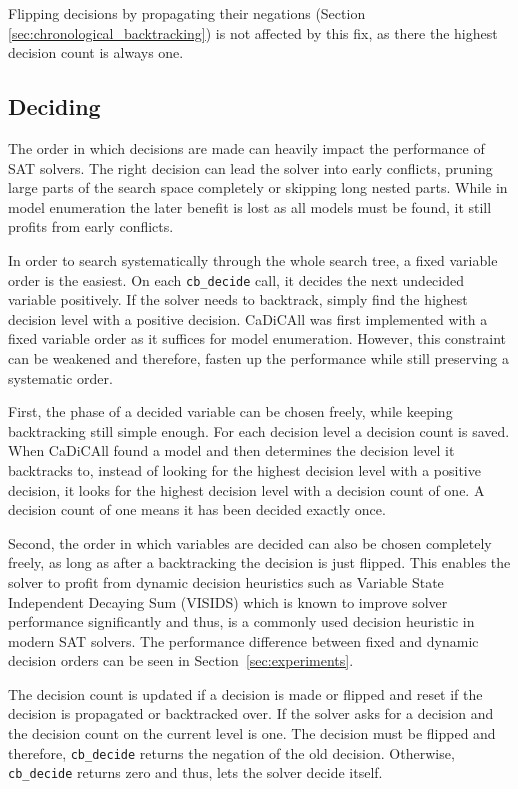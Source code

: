 \documentclass[12pt,a4paper]{article}
\begin{document}
Flipping decisions by propagating their negations (Section \ref{sec:chronological_backtracking}) is not affected by this fix, as there the highest decision count is always one.

\subsection{Deciding}
\label{sec:deciding}

The order in which decisions are made can heavily impact the performance of SAT solvers. The right decision can lead the solver into early conflicts, pruning large parts of the search space completely or skipping long nested parts. While in model enumeration the later benefit is lost as all models must be found, it still profits from early conflicts.

In order to search systematically through the whole search tree, a fixed variable order is the easiest. On each \verb|cb_decide| call, it decides the next undecided variable positively. If the solver needs to backtrack, simply find the highest decision level with a positive decision. CaDiCAll was first implemented with a fixed variable order as it suffices for model enumeration. However, this constraint can be weakened and therefore, fasten up the performance while still preserving a systematic order.

First, the phase of a decided variable can be chosen freely, while keeping backtracking still simple enough. For each decision level a decision count is saved. When CaDiCAll found a model and then determines the decision level it backtracks to, instead of looking for the highest decision level with a positive decision, it looks for the highest decision level with a decision count of one. A decision count of one means it has been decided exactly once.

Second, the order in which variables are decided can also be chosen completely freely, as long as after a backtracking the decision is just flipped. This enables the solver to profit from dynamic decision heuristics such as Variable State Independent Decaying Sum (VISIDS) which is known to improve solver performance significantly and thus, is a commonly used decision heuristic in modern SAT solvers. The performance difference between fixed and dynamic decision orders can be seen in Section~\ref{sec:experiments}.

The decision count is updated if a decision is made or flipped and reset if the decision is propagated or backtracked over. If the solver asks for a decision and the decision count on the current level is one. The decision must be flipped and therefore, \verb|cb_decide| returns the negation of the old decision. Otherwise, \verb|cb_decide| returns zero and thus, lets the solver decide itself.
\end{document}
